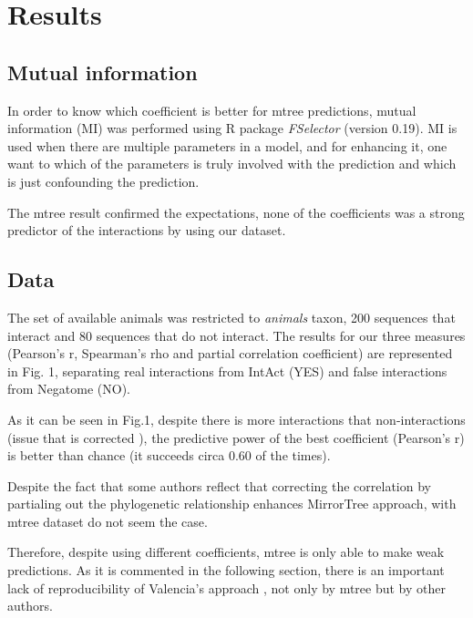 \documentclass[11pt]{article}
\begin{document}
\section{Results}
\subsection{Mutual information}
In order to know which coefficient is better for mtree predictions, mutual information (MI) was performed using R package \textit{FSelector} (version 0.19). 
MI is used when there are multiple parameters in a model, and for enhancing it, one want to which of the parameters is truly involved with the prediction and which is just confounding the prediction.

The mtree result confirmed the expectations, none of the coefficients was a strong predictor of the interactions by using our dataset.
\subsection{Data}

The set of available animals was restricted to \textit{animals} taxon, 200 sequences that interact and 80 sequences that do not interact. The results for our three measures (Pearson's r, Spearman's rho and partial correlation coefficient) are represented in Fig. 1, separating real interactions from IntAct (YES) and false interactions from Negatome (NO).

As it can be seen in Fig.1, despite there is more interactions that non-interactions (issue that is corrected ), the predictive power of the best coefficient (Pearson's r) is better than chance (it succeeds circa 0.60 of the times).

Despite the fact that some authors\cite{Sato2005} reflect that correcting the correlation by partialing out the phylogenetic relationship enhances MirrorTree approach, with mtree dataset do not seem the case.

Therefore, despite using different coefficients, mtree is only able to make weak predictions. As it is commented in the following section, there is an important lack of reproducibility of Valencia's approach \cite{Pazos2001}, not only by mtree but by other authors. 
\end{document}
